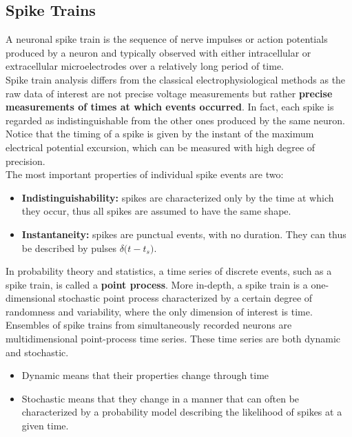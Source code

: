 \subsection{Spike Trains}
A neuronal spike train is the sequence of nerve impulses or action
potentials produced by a neuron and typically observed with either
intracellular or extracellular microelectrodes over a relatively long
period of time.\\
Spike train analysis differs from the classical electrophysiological methods
as the raw data of interest are not precise voltage measurements but
rather \textbf{precise measurements of times at which events occurred}. In
fact, each spike is regarded as indistinguishable from the other ones produced by
the same neuron. Notice that the timing of a spike is given by the instant
of the maximum electrical potential excursion, which can be measured with
high degree of precision.\\
The most important properties of individual spike events are two:
\begin{itemize}
      \item \textbf{Indistinguishability:} spikes are characterized only by the
            time at which they occur, thus all spikes are assumed to have the same shape.
      \item \textbf{Instantaneity:} spikes are punctual events, with no duration.
            They can thus be described by pulses \(\delta\bigl(t-t_s\bigr)\).
\end{itemize}
In probability theory and statistics, a time series of discrete events,
such as a spike train, is called a \textbf{point process}. More
in-depth, a spike train is a one-dimensional stochastic point process characterized by a
certain degree of randomness and variability, where the only dimension of
interest is time.\\
Ensembles of spike trains from simultaneously recorded neurons are multidimensional point-process time series. These time series are both dynamic
and stochastic.
\begin{itemize}
      \item Dynamic means that their properties change through time
      \item Stochastic means that they change in a manner that can often be
            characterized by a probability model describing the likelihood of spikes
            at a given time.
\end{itemize}
